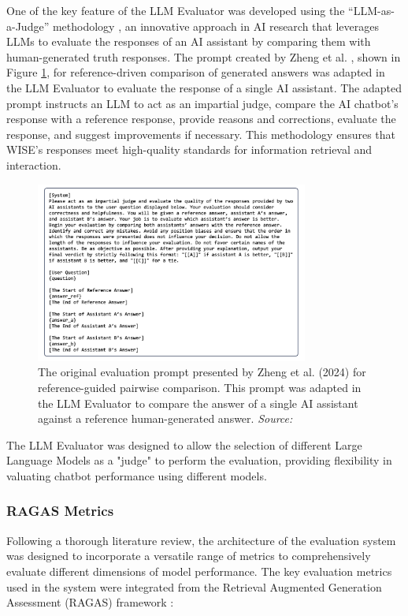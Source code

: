 One of the key feature of the LLM Evaluator was developed using the “LLM-as-a-Judge” methodology \cite{zheng2024judging}, an innovative approach in AI research that leverages LLMs to evaluate the responses of an AI assistant by comparing them with human-generated truth responses. The prompt created by Zheng et al. \cite{zheng2024judging}, shown in Figure \ref{fig:llme-prompt}, for reference-driven comparison of generated answers was adapted in the LLM Evaluator to evaluate the response of a single AI assistant. The adapted prompt instructs an LLM to act as an impartial judge, compare the AI chatbot's response with a reference response, provide reasons and corrections, evaluate the response, and suggest improvements if necessary. This methodology ensures that WISE's responses meet high-quality standards for information retrieval and interaction.

\begin{figure}[h!]
    \centering
    \includegraphics[width=0.8\textwidth]{images/llme/zheng-prompt-original.png}
    \caption{The original evaluation prompt presented by Zheng et al. (2024) for reference-guided pairwise comparison. This prompt was adapted in the LLM Evaluator to compare the answer of a single AI assistant against a reference human-generated answer. \textit{Source:} \cite{zheng2024judging}}
    \label{fig:llme-prompt}
\end{figure}

 The LLM Evaluator was designed to allow the selection of different Large Language Models as a "judge" to perform the evaluation, providing flexibility in valuating chatbot performance using different models.

\subsubsection{RAGAS Metrics}
Following a thorough literature review, the architecture of the evaluation system was designed to incorporate a versatile range of metrics to comprehensively evaluate different dimensions of model performance. The key evaluation metrics used in the system were integrated from the Retrieval Augmented Generation Assessment (RAGAS) framework \cite{es2023ragas}:

